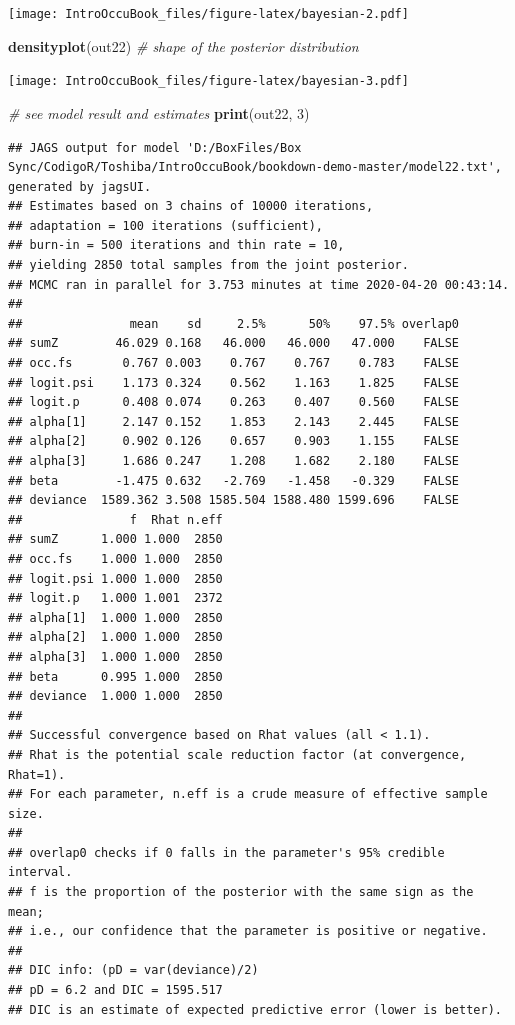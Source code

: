 \documentclass[
]{book}
\newenvironment{Shaded}{\begin{snugshade}}{\end{snugshade}}
\newcommand{\CommentTok}[1]{\textcolor[rgb]{0.56,0.35,0.01}{\textit{#1}}}
\newcommand{\DecValTok}[1]{\textcolor[rgb]{0.00,0.00,0.81}{#1}}
\newcommand{\KeywordTok}[1]{\textcolor[rgb]{0.13,0.29,0.53}{\textbf{#1}}}
\newcommand{\NormalTok}[1]{#1}
\begin{document}
\texttt{[image: IntroOccuBook\_files/figure-latex/bayesian-2.pdf]}

\begin{Shaded}
\begin{Highlighting}[]
\KeywordTok{densityplot}\NormalTok{(out22)  }\CommentTok{# shape of the posterior distribution}
\end{Highlighting}
\end{Shaded}

\texttt{[image: IntroOccuBook\_files/figure-latex/bayesian-3.pdf]}

\begin{Shaded}
\begin{Highlighting}[]
\CommentTok{# see model result and estimates  }
\KeywordTok{print}\NormalTok{(out22, }\DecValTok{3}\NormalTok{)}
\end{Highlighting}
\end{Shaded}

\begin{verbatim}
## JAGS output for model 'D:/BoxFiles/Box Sync/CodigoR/Toshiba/IntroOccuBook/bookdown-demo-master/model22.txt', generated by jagsUI.
## Estimates based on 3 chains of 10000 iterations,
## adaptation = 100 iterations (sufficient),
## burn-in = 500 iterations and thin rate = 10,
## yielding 2850 total samples from the joint posterior.
## MCMC ran in parallel for 3.753 minutes at time 2020-04-20 00:43:14.
##
##               mean    sd     2.5%      50%    97.5% overlap0
## sumZ        46.029 0.168   46.000   46.000   47.000    FALSE
## occ.fs       0.767 0.003    0.767    0.767    0.783    FALSE
## logit.psi    1.173 0.324    0.562    1.163    1.825    FALSE
## logit.p      0.408 0.074    0.263    0.407    0.560    FALSE
## alpha[1]     2.147 0.152    1.853    2.143    2.445    FALSE
## alpha[2]     0.902 0.126    0.657    0.903    1.155    FALSE
## alpha[3]     1.686 0.247    1.208    1.682    2.180    FALSE
## beta        -1.475 0.632   -2.769   -1.458   -0.329    FALSE
## deviance  1589.362 3.508 1585.504 1588.480 1599.696    FALSE
##               f  Rhat n.eff
## sumZ      1.000 1.000  2850
## occ.fs    1.000 1.000  2850
## logit.psi 1.000 1.000  2850
## logit.p   1.000 1.001  2372
## alpha[1]  1.000 1.000  2850
## alpha[2]  1.000 1.000  2850
## alpha[3]  1.000 1.000  2850
## beta      0.995 1.000  2850
## deviance  1.000 1.000  2850
##
## Successful convergence based on Rhat values (all < 1.1).
## Rhat is the potential scale reduction factor (at convergence, Rhat=1).
## For each parameter, n.eff is a crude measure of effective sample size.
##
## overlap0 checks if 0 falls in the parameter's 95% credible interval.
## f is the proportion of the posterior with the same sign as the mean;
## i.e., our confidence that the parameter is positive or negative.
##
## DIC info: (pD = var(deviance)/2)
## pD = 6.2 and DIC = 1595.517
## DIC is an estimate of expected predictive error (lower is better).
\end{verbatim}
\end{document}
